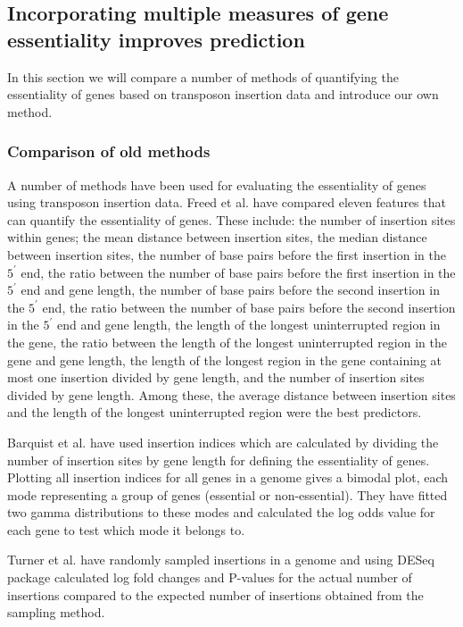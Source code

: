 \documentclass[12pt,letterpaper]{article}
\begin{document}
\subsection{Incorporating multiple measures of gene essentiality improves prediction}
In this section we will compare a number of methods of quantifying the essentiality of genes based on transposon insertion data and introduce our own method.
\subsubsection{Comparison of old methods}
A number of methods have been used for evaluating the essentiality of genes using transposon insertion data. Freed et al. \cite{freed_combining_2016} have compared eleven features that can quantify the essentiality of genes. These include: the number of insertion sites within genes; the mean distance between insertion sites, the median distance between insertion sites, the number of base pairs before the first insertion in the $5^\prime$ end, the ratio between the number of base pairs before the first insertion in the $5^\prime$ end and gene length, the number of base pairs before the second insertion in the $5^\prime$ end, the ratio between the number of base pairs before the second insertion in the $5^\prime$ end and gene length, the length of the longest uninterrupted region in the gene, the ratio between the length of the longest uninterrupted region in the gene and gene length, the length of the longest region in the gene containing at most one insertion divided by gene length, and the number of insertion sites divided by gene length. Among these, the average distance between insertion sites and the length of the longest uninterrupted region were the best predictors.

Barquist et al. \cite{barquist_tradis_2016} have used insertion indices which are calculated by dividing the number of insertion sites by gene length for defining the essentiality of genes. Plotting all insertion indices for all genes in a genome gives a bimodal plot, each mode representing a group of genes (essential or non-essential). They have fitted two gamma distributions to these modes and calculated the log odds value for each gene to test which mode it belongs to.

Turner et al. \cite{turner_essential_2015} have randomly sampled insertions in a genome and using DESeq package \cite{anders_differential_2010} calculated log fold changes and P-values for the actual number of insertions compared to the expected number of insertions obtained from the sampling method.
\end{document}
